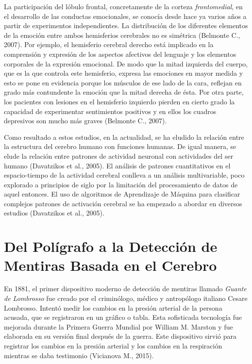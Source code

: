 La participación del lóbulo frontal, concretamente de la corteza \textit{frontomedial}, en el desarrollo de las conductas  emocionales, se conocía  desde  hace ya varios años a partir de experimentos independientes. La distribución de los diferentes elementos de la emoción entre ambos hemisferios cerebrales no es simétrica (Belmonte C., 2007). Por ejemplo, el hemisferio cerebral derecho está implicado en la comprensión y expresión de los aspectos afectivos del lenguaje y los elementos corporales de la expresión emocional. De modo que la mitad izquierda del cuerpo, que es la que controla  este  hemisferio,  expresa  las  emociones en mayor medida y esto se pone en evidencia porque los músculos de ese lado de la cara, reflejan en grado más contundente la emoción que la mitad derecha de ésta. Por otra parte, los pacientes con lesiones en el hemisferio izquierdo pierden en cierto grado la capacidad  de  experimentar sentimientos  positivos  y  en  ellos  los  cuadros  depresivos son mucho más graves (Belmonte C., 2007).

Como resultado a estos estudios, en la actualidad, se ha eludido la relación entre la estructura del cerebro humano con funciones humanas. De igual manera, se elude la relación entre patrones de actividad neuronal con actividades del ser humano (Davatzikos et al., 2005). El análisis de patrones cuantitativos en el espacio-tiempo de la actividad cerebral conlleva a un análisis multivariable, poco explorado a principios de siglo por la limitación del procesamiento de datos de aquel entonces. El uso de algoritmos de Aprendizaje de Máquina para clasificar complejos patrones de activación cerebral se ha empezado a abordar en diversos estudios (Davatzikos et al., 2005).

\section{Del Polígrafo a la Detección de Mentiras Basada en el Cerebro}
En 1881, el primer dispositivo moderno de detección de mentiras llamado \textit{Guante de Lombrosso} fue creado por el criminólogo, médico y antropólogo italiano Cesare Lombrosso. Intentó medir los cambios en la presión arterial de la persona acusada, que se registraron en un gráfico o tabla. Esta sofisticada tecnología fue mejorada durante la Primera Guerra Mundial por William M. Marston y fue elaborada en su versión final después de la guerra. Este dispositivo sirvió para registrar los cambios en la presión arterial y los cambios en la respiración mientras se daba testimonio (Vicianova M., 2015).  

